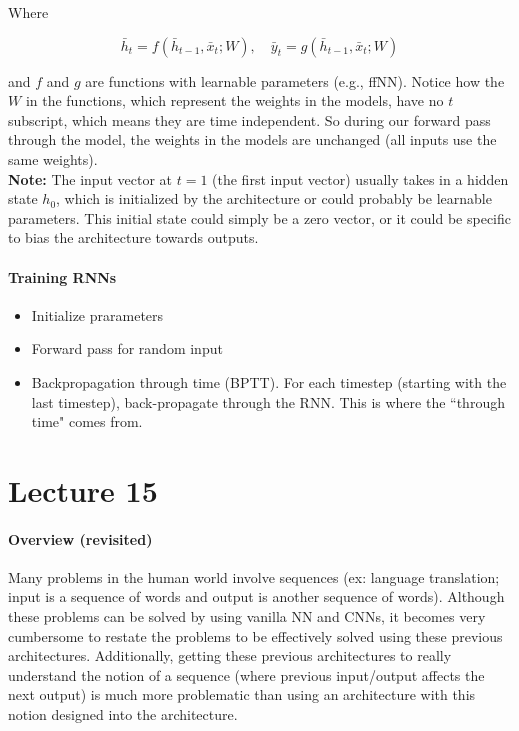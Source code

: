 \documentclass[12pt]{article}
\begin{document}
Where

\[ \bar h_t = f(\bar h_{t-1}, \bar x_t; W), \quad \bar y_t = g(\bar h_{t-1}, \bar x_t; W) \]

and $f$ and $g$ are functions with learnable parameters (e.g., ffNN). Notice how the $W$ in the functions, which represent the weights in the models, have no $t$ subscript, which means they are time independent. So during our forward pass through the model, the weights in the models are unchanged (all inputs use the same weights).\\

\textbf{Note:} The input vector at $t=1$ (the first input vector) usually takes in a hidden state $h_0$, which is initialized by the architecture or could probably be learnable parameters. This initial state could simply be a zero vector, or it could be specific to bias the architecture towards outputs.

\subsection{Training RNNs}

\begin{itemize}
	\item Initialize prarameters
	\item Forward pass for random input
	\item Backpropagation through time (BPTT). For each timestep (starting with the last timestep), back-propagate through the RNN. This is where the ``through time" comes from.
\end{itemize}

\part{Lecture 15}

\subsection{Overview (revisited)}

Many problems in the human world involve sequences (ex: language translation; input is a sequence of words and output is another sequence of words). Although these problems can be solved by using vanilla NN and CNNs, it becomes very cumbersome to restate the problems to be effectively solved using these previous architectures. Additionally, getting these previous architectures to really understand the notion of a sequence (where previous input/output affects the next output) is much more problematic than using an architecture with this notion designed into the architecture.\\
\end{document}
